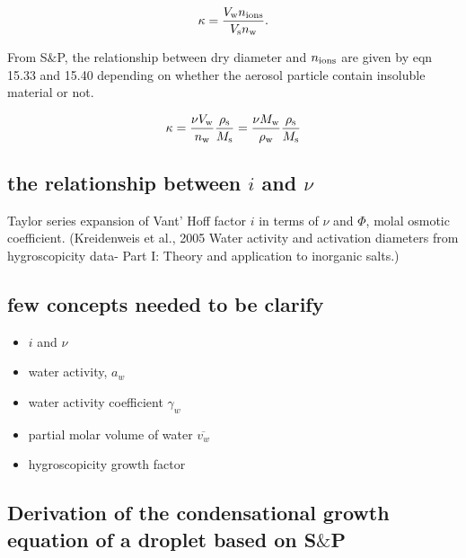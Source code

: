 \documentclass[12pt]{article}
\begin{document}
\begin{equation}\label{eqn:6}
\kappa= \frac{V_{\rm w} n_{\rm ions}}{V_{\rm s} n_{\rm w}}.
\end{equation}

From S$\&$P, the relationship between dry diameter and $n_{\rm ions}$ are given by eqn 15.33 and 15.40 depending on whether the aerosol particle contain insoluble material or not.

\begin{equation}\label{eqn:7}
\kappa= \frac{\nu V_{\rm w}}{n_{\rm w}}  \frac{\rho_{\rm s}}{M_{\rm s}}= \frac{\nu M_{\rm w}}{\rho_{\rm w}}  \frac{\rho_{\rm s}}{M_{\rm s}}
\end{equation}


\subsection{the relationship between $i$ and $\nu$}

Taylor series expansion of Vant' Hoff factor $i$ in terms of $\nu$ and $\Phi$, molal osmotic coefficient. (Kreidenweis et al., 2005 Water activity and activation diameters from hygroscopicity data- Part I: Theory and application to inorganic salts.)


\subsection{few concepts needed to be clarify}

\begin{itemize}

\item $i$ and $\nu$
\item water activity, $a_{w}$
\item water activity coefficient $\gamma_{w}$
\item partial molar volume of water $\overline{v_{w}}$
\item hygroscopicity growth factor

\end{itemize}

\subsection{Derivation of the condensational growth equation of a droplet based on S$\&$P}
\end{document}
